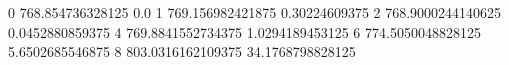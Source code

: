 0 768.854736328125 0.0
1 769.156982421875 0.30224609375
2 768.9000244140625 0.0452880859375
4 769.8841552734375 1.0294189453125
6 774.5050048828125 5.6502685546875
8 803.0316162109375 34.1768798828125
